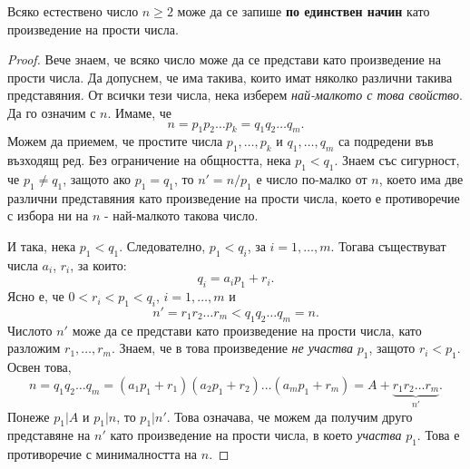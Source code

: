 \begin{thm}
  \label{th:main-arithmetic}
  Всяко естествено число $n \geq 2$ може да се запише {\bf по единствен начин} като произведение на прости числа.
\end{thm}
\begin{proof}
  Вече знаем, че всяко число може да се представи като произведение на прости числа.
  Да допуснем, че има такива, които имат няколко различни такива представяния.
  От всички тези числа, нека изберем {\em най-малкото с това свойство}.
  Да го означим с $n$. Имаме, че  
  \[n = p_1p_2\dots p_k = q_1q_2\dots q_m.\]
  Можем да приемем, че простите числа $p_1,\dots,p_k$ и $q_1,\dots,q_m$ са подредени във възходящ ред.
  Без ограничение на общността, нека $p_1 < q_1$.
  Знаем със сигурност, че $p_1 \neq q_1$, защото ако $p_1 = q_1$, то $n' = n/p_1$ 
  е число по-малко от $n$, което има две различни представяния като произведение на прости числа, което е противоречие с избора ни на $n$ - 
  най-малкото такова число.
  
  И така, нека $p_1 < q_1$. Следователно, $p_1 < q_i$, за $i = 1, \dots, m$.
  Тогава съществуват числа $a_i$, $r_i$, за които:
  \[q_i = a_ip_1 + r_i.\]
  Ясно е, че $0 < r_i < p_1 < q_i$, $i = 1,\dots, m$ и 
  \[n' = r_1r_2\dots r_m < q_1q_2\dots q_m = n.\]
  Числото $n'$ може да се представи като произведение на прости числа, като разложим $r_1,\dots,r_m$.
  Знаем, че в това произведение {\em не участва} $p_1$, защото $r_i < p_1$.
  Освен това,
  \[n = q_1q_2\dots q_m = (a_1p_1+r_1)(a_2p_1 + r_2)\dots(a_mp_1+r_m) = A + \underbrace{r_1r_2\dots r_m}_{n'}.\]
  Понеже $p_1 | A$ и $p_1 | n$, то $p_1 | n'$.
  Това означава, че можем да получим друго представяне на $n'$ като произведение на прости числа, в което {\em участва} $p_1$.
  Това е противоречие с минималността на $n$.
\end{proof}

